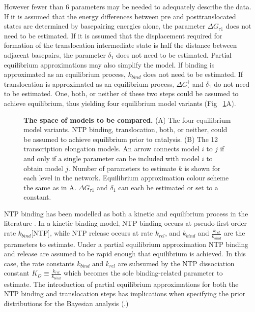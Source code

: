 \documentclass[10pt,letterpaper]{article}
\begin{document}
However fewer than 6 parameters may be needed to adequately describe the data. If it is assumed that the energy differences between pre and posttranslocated states are determined by basepairing energies alone, the parameter $\Delta G_{\tau 1}$ does not need to be estimated. If it is assumed that the displacement required for formation of the translocation intermediate state is half the distance between adjacent basepairs, the parameter $\delta_1$ does not need to be estimated. Partial equilibrium approximations may also simplify the model. If binding is approximated as an equilibrium process, $k_{bind}$ does not need to be estimated. If translocation is approximated as an equilibrium process,  $\Delta G^\dag_{\tau}$ and $\delta_1$ do not need to be estimated. One, both, or neither of these two steps could be assumed to achieve equilibrium, thus yielding four equilibrium model variants (Fig ~\ref{fig4}A).

\begin{figure}[!h]
\caption{{\bf The space of models to be compared.} (A) The four equilibrium model variants. NTP binding, translocation, both, or neither, could be assumed to achieve equilibrium prior to catalysis. (B) The 12 transcription elongation models. An arrow connects model $i$ to $j$ if and only if a single parameter can be included with model $i$ to obtain model $j$. Number of parameters to estimate  $k$ is shown for each level in the network. Equilibrium approximation colour scheme the same as in A. $\Delta G_{\tau 1}$ and $\delta_1$ can each be estimated or set to a constant.}
\label{fig4}
\end{figure}



NTP binding has been modelled as both a kinetic and equilibrium process in the literature \cite{bai2004sequence, abbondanzieri2005direct, maoileidigh2011unified}. In a kinetic binding model, NTP binding occurs at pseudo-first order rate $k_{bind}$[NTP], while NTP release occurs at rate $k_{rel}$, and $k_{bind}$ and $\frac{k_{rel}}{k_{bind}}$ are the parameters to estimate. Under a partial equilibrium approximation NTP binding and release are assumed to be rapid enough that equilibrium is achieved. In this case, the rate constants $k_{bind}$ and $k_{rel}$ are subsumed by the NTP dissociation constant $K_D \equiv \frac{k_{rel}}{k_{bind}}$ which becomes the sole binding-related parameter to estimate. The introduction of partial equilibrium approximations for both the NTP binding and translocation steps has implications when specifying the prior distributions for the Bayesian analysis (.)
\end{document}
